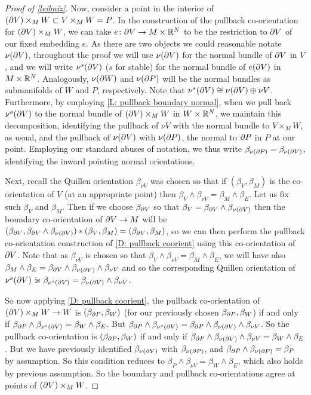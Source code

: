 \begin{proof}[Proof of \cref{leibniz}]
	Now, consider a point in the interior of $(\partial V) \times_M W \subset V \times_M W = P$.
	In the construction of the pullback co-orientation for $(\partial V) \times_M W$, we can take $e \colon \partial V \to M \times \mathbb{R}^N$ to be the restriction to $\partial V$ of our fixed embedding $e$.
	As there are two objects we could reasonable notate $\nu (\partial V)$, throughout the proof we will use $\nu (\partial V)$ for the normal bundle of $\partial V$ in $V$, and we will write $\nu^s(\partial V)$ ($s$ for stable) for the normal bundle of $e(\partial V)$ in $M \times \mathbb{R}^N$.
	Analogously, $\nu(\partial W)$ and $\nu(\partial P)$ will be the normal bundles as submanifolds of $W$ and $P$, respectively.
	Note that $\nu^s(\partial V) \cong \nu(\partial V) \oplus \nu V$.
	Furthermore, by employing \cref{L: pullback boundary normal}, when we pull back $\nu^s(\partial V)$ to the normal bundle of $(\partial V) \times_M W$ in $W \times \mathbb{R}^N$, we maintain this decomposition, identifying the pullback of $\nu V$ with the normal bundle to $V \times_M W$, as usual, and the pullback of $\nu(\partial V)$ with $\nu (\partial P)$, the normal to $\partial P$ in $P$ at our point.
	Employing our standard abuses of notation, we thus write $\beta_{\nu(\partial P)} = \beta_{\nu(\partial V)}$, identifying the inward pointing normal orientations.

	Next, recall the Quillen orientation $\beta_{\nu V}$ was chosen so that if $(\beta_V, \beta_M)$ is the co-orientation of $V$ (at an appropriate point) then $\beta_V \wedge \beta_{\nu V} = \beta_{M} \wedge \beta_E$.
	Let us fix such $\beta_V$ and $\beta_M$.
	Then if we choose $\beta_{\partial V}$ so that $\beta_V = \beta_{\partial V} \wedge \beta_{\nu(\partial V)}$ then the boundary co-orientation of $\partial V \to M$ will be $(\beta_{\partial V}, \beta_{\partial V} \wedge \beta_{\nu(\partial V)}) * (\beta_V, \beta_M) = (\beta_{\partial V},\beta_M)$, so we can then perform the pullback co-orientation construction of \cref{D: pullback coorient} using this co-orientation of $\partial V$.
	Note that as $\beta_{\nu V}$ is chosen so that $\beta_V \wedge \beta_{\nu V} = \beta_M \wedge \beta_E$, we will have also $\beta_M \wedge \beta_E = \beta_{\partial V} \wedge \beta_{\nu(\partial V)} \wedge \beta_{\nu V}$ and so the corresponding Quillen orientation of $\nu^s(\partial V)$ is $\beta_{\nu^s(\partial V)} = \beta_{\nu(\partial V)} \wedge \beta_{\nu V}$.

	So now applying \cref{D: pullback coorient}, the pullback co-orientation of $(\partial V) \times_M W \to W$ is $(\beta_{\partial P},\beta_W)$ (for our previously chosen $\beta_{\partial P}, \beta_W$) if and only if $\beta_{\partial P} \wedge \beta_{\nu^s(\partial V)} = \beta_W \wedge \beta_E$.
	But $\beta_{\partial P} \wedge \beta_{\nu^s(\partial V)} = \beta_{\partial P} \wedge \beta_{\nu(\partial V)} \wedge \beta_{\nu V}$.
	So the pullback co-orientation is $(\beta_{\partial P},\beta_W)$ if and only if $\beta_{\partial P} \wedge \beta_{\nu(\partial V)} \wedge \beta_{\nu V} = \beta_W \wedge \beta_E$.
	But we have previously identified $\beta_{\nu(\partial V)}$ with $\beta_{\nu(\partial P)}$, and $\beta_{\partial P} \wedge \beta_{\nu(\partial P)} = \beta_P$ by assumption.
	So this condition reduces to $\beta_P \wedge \beta_{\nu V} = \beta_W \wedge \beta_E$, which also holds by previous assumption.
	So the boundary and pullback co-orientations agree at points of $(\partial V) \times_M W$.


\end{proof}
